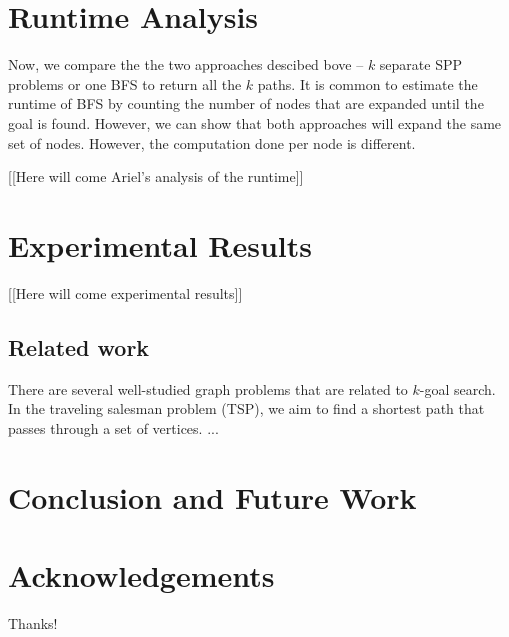 \documentclass{aicom2e}
\begin{document}
\section{Runtime Analysis}
Now, we compare the the two approaches descibed bove -- $k$ separate SPP problems or one BFS to return all the $k$ paths. 
It is common to estimate the runtime of BFS by counting the number of nodes that are expanded until the goal is found. However, we can show that both approaches will expand the same set of nodes.  However, the computation done per node is different. 

[[Here will come Ariel's analysis of the runtime]]




\section{Experimental Results}
[[Here will come experimental results]]

\subsection*{Related work}

There are several well-studied graph problems that are related to $k$-goal search. In the traveling salesman problem (TSP), we aim to find a shortest path that passes through a set of vertices. 
...

\section{Conclusion and Future Work}


\section*{Acknowledgements}
Thanks!



\end{document}
